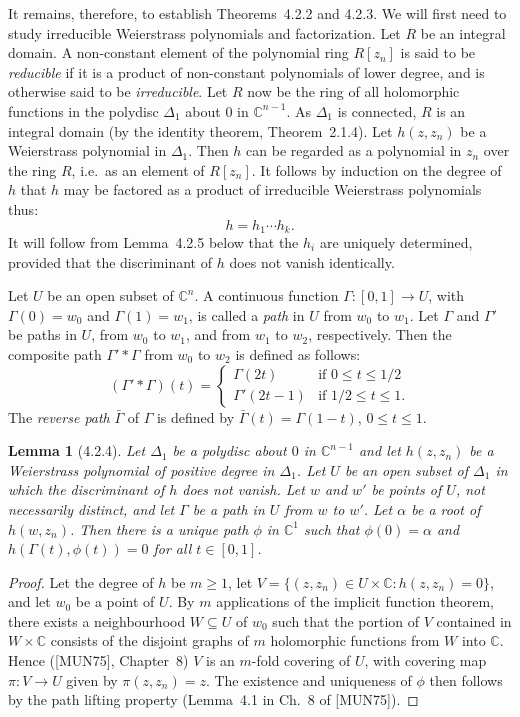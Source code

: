 \documentclass[11pt]{article}
\theoremstyle{plain}
\newtheorem*{lemma*}{Lemma}
\theoremstyle{definition}
\newcommand{\C}{\mathbb{C}}
\begin{document}
It remains, therefore, to establish Theorems~4.2.2 and 4.2.3. We will
first need to study irreducible Weierstrass polynomials and
factorization. Let $R$ be an integral domain. A non-constant element
of the polynomial ring $R[z_n]$ is said to be \emph{reducible} if it
is a product of non-constant polynomials of lower degree, and is
otherwise said to be \emph{irreducible}. Let $R$ now be the ring of
all holomorphic functions in the polydisc $\Delta_1$ about $0$ in
$\C^{n-1}$. As $\Delta_1$ is connected, $R$ is an integral domain (by
the identity theorem, Theorem~2.1.4). Let $h(z, z_n)$ be a Weierstrass
polynomial in $\Delta_1$. Then $h$ can be regarded as a polynomial in
$z_n$ over the ring $R$, i.e.\ as an element of $R[z_n]$. It follows
by induction on the degree of $h$ that $h$ may be factored as a
product of irreducible Weierstrass polynomials thus:
\[
h = h_1 \cdots h_k.
\]
It will follow from Lemma~4.2.5 below that the $h_i$ are uniquely
determined, provided that the discriminant of $h$ does not vanish
identically.

Let $U$ be an open subset of $\C^n$. A continuous function
$\Gamma : [0, 1] \to U$, with $\Gamma(0) = w_0$ and $\Gamma(1) = w_1$,
is called a \emph{path} in $U$ from $w_0$ to $w_1$. Let $\Gamma$ and
$\Gamma'$ be paths in $U$, from $w_0$ to $w_1$, and from $w_1$ to
$w_2$, respectively. Then the composite path $\Gamma' * \Gamma$ from
$w_0$ to $w_2$ is defined as follows:
\[
(\Gamma' * \Gamma)(t) =
\begin{cases}
\Gamma(2t) & \text{if } 0 \le t \le 1/2 \\
\Gamma'(2t - 1) & \text{if } 1/2 \le t \le 1.
\end{cases}
\]
The \emph{reverse path} $\bar{\Gamma}$ of $\Gamma$ is defined by
$\bar{\Gamma}(t) = \Gamma(1 - t)$, $0 \le t \le 1$.

\begin{lemma*}[4.2.4]
Let $\Delta_1$ be a polydisc about $0$ in $\C^{n-1}$ and let
$h(z, z_n)$ be a Weierstrass polynomial of positive degree in
$\Delta_1$. Let $U$ be an open subset of $\Delta_1$ in which the
discriminant of $h$ does not vanish. Let $w$ and $w'$ be points of
$U$, not necessarily distinct, and let $\Gamma$ be a path in $U$
from $w$ to $w'$. Let $\alpha$ be a root of $h(w, z_n)$. Then there
is a unique path $\phi$ in $\C^1$ such that $\phi(0) = \alpha$ and
$h(\Gamma(t), \phi(t)) = 0$ for all $t \in [0, 1]$.
\end{lemma*}

\begin{proof}
Let the degree of $h$ be $m \ge 1$, let
$V = \{ (z, z_n) \in U \times \C : h(z, z_n) = 0 \}$, and let $w_0$ be
a point of $U$. By $m$ applications of the implicit function theorem,
there exists a neighbourhood $W \subseteq U$ of $w_0$ such that the
portion of $V$ contained in $W \times \C$ consists of the disjoint
graphs of $m$ holomorphic functions from $W$ into $\C$. Hence
([MUN75], Chapter~8) $V$ is an $m$-fold covering of $U$, with
covering map $\pi : V \to U$ given by $\pi(z, z_n) = z$. The existence
and uniqueness of $\phi$ then follows by the path lifting property
(Lemma~4.1 in Ch.~8 of [MUN75]).
\end{proof}
\end{document}
